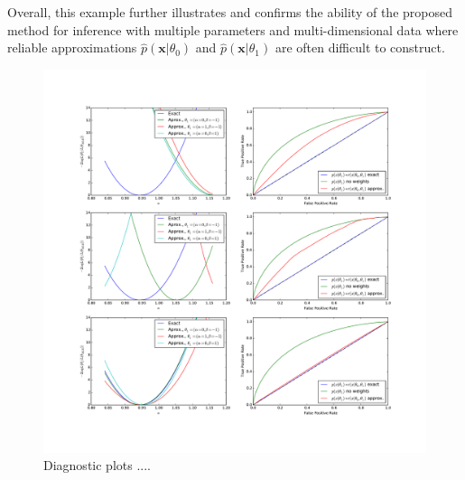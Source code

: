 \documentclass[12pt]{article}
\numberwithin{equation}{section}
\theoremstyle{plain}
\begin{document}
Overall, this example further illustrates and confirms the ability
of the proposed method for inference with multiple parameters and multi-dimensional data where
reliable approximations $\hat p(\mathbf{x}|\theta_0)$ and $\hat p(\mathbf{x}|\theta_1)$
are often difficult to construct.


\begin{figure}
    \centering
    \includegraphics[height=.9\textheight]{figures/diagnostics.pdf}
    \caption{Diagnostic plots ....}
    \label{fig:ratio_comp}
\end{figure}
\end{document}
